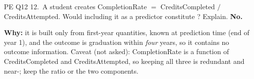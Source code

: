 \begin{qbox}{PE Q12}
12.~A student creates CompletionRate $=$ CreditsCompleted $/$ CreditsAttempted. Would including it as a predictor constitute ? Explain.
\ans \textbf{No.}\par
\textbf{Why:} it is built only from first-year quantities, known at prediction time (end of year 1), and the outcome is graduation within \emph{four} years, so it contains no outcome information. Caveat (not asked): CompletionRate is a function of CreditsCompleted and CreditsAttempted, so keeping all three is redundant and near-; keep the ratio or the two components. 
\end{qbox}

